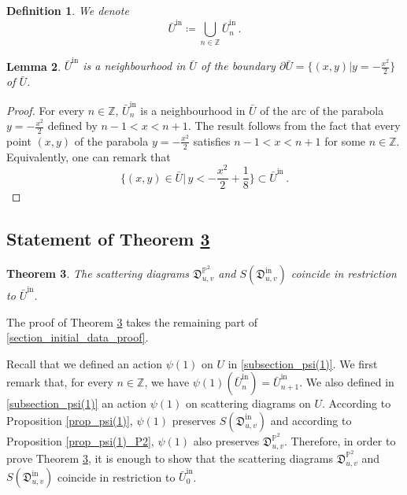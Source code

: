 \documentclass[12pt, a4paper]{amsart}
\newtheorem{defn}{Definition}[section]
\newtheorem{thm}[defn]{Theorem}
\newtheorem{lem}[defn]{Lemma}
\newcommand\PP{\mathbb P}
\newcommand\Z{\mathbb Z}
\newcommand\fD{\mathfrak D}
\newcommand\iin{\mathrm{in}}
\begin{document}
\begin{defn}
We denote 
\[ \bar{U}^\iin \coloneq \bigcup_{n \in \Z}
\bar{U}_n^\iin\,.\]
\end{defn}

\begin{lem}
$\bar{U}^\iin$ is a neighbourhood in 
$\bar{U}$ of 
the boundary $\partial \bar{U}=\{(x,y)|y=-\frac{x^2}{2}\}$ of $\bar{U}$.
\end{lem}

\begin{proof}
For every $n \in \Z$, $\bar{U}_n^\iin$
is a neighbourhood in 
$\bar{U}$ of the arc of the parabola 
$y=-\frac{x^2}{2}$ defined by $n-1<x<n+1$.
The result follows from the fact that every point $(x,y)$ of the parabola 
$y=-\frac{x^2}{2}$ satisfies $n-1<x<n+1$ for some $n \in \Z$. Equivalently, one can remark that 
\[ \{(x,y)\in\bar{U}|\,y<-\frac{x^2}{2}+\frac{1}{8}\} \subset \bar{U}^\iin\,.\]
\end{proof}


\subsection{Statement of Theorem \ref{thm_coincide_initial}}
\label{section_statement_initial}

\begin{thm} \label{thm_coincide_initial}
The scattering diagrams $\fD_{u,v}^{\PP^2}$ and $S(\fD_{u,v}^\iin)$
coincide in restriction to $\bar{U}^\iin$.
\end{thm}

The proof of Theorem
\ref{thm_coincide_initial} takes the remaining part of 
\cref{section_initial_data_proof}.

Recall that we defined an action
$\psi(1)$ on $U$ in
\cref{subsection_psi(1)}.
We first remark that, for every $n \in \Z$, we have $\psi(1)(\bar{U}_n^\iin)=\bar{U}_{n+1}^\iin$. We also defined in
\cref{subsection_psi(1)} an action 
$\psi(1)$ on scattering diagrams on $U$.
According to Proposition \ref{prop_psi(1)}, 
$\psi(1)$ preserves $S(\fD_{u,v}^\iin)$
and according to Proposition
\ref{prop_psi(1)_P2}, $\psi(1)$ also 
preserves $\fD_{u,v}^{\PP^2}$.
Therefore, in order to prove Theorem
\ref{thm_coincide_initial}, it is enough to show that the scattering diagrams $\fD_{u,v}^{\PP^2}$ and $S(\fD_{u,v}^\iin)$
coincide in restriction to $\bar{U}_0^\iin$.
\end{document}
